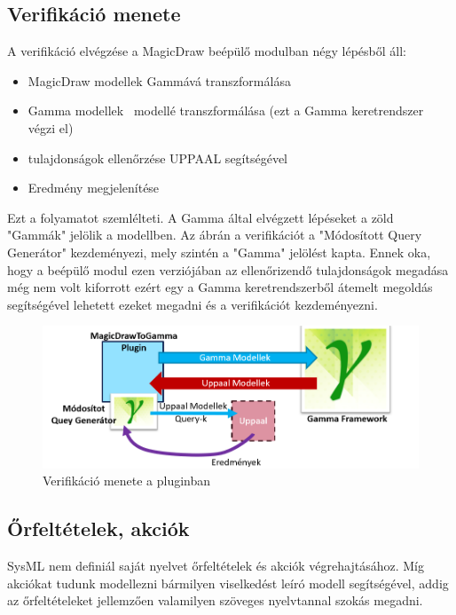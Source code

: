 \subsection{Verifikáció menete}

A verifikáció elvégzése a MagicDraw beépülő modulban négy lépésből áll: 
\begin{itemize}
	\item MagicDraw modellek Gammává transzformálása
	\item Gamma modellek \uppaal\ modellé transzformálása (ezt a Gamma keretrendszer végzi el)
	\item tulajdonságok ellenőrzése UPPAAL segítségével
	\item Eredmény megjelenítése
\end{itemize}
Ezt a folyamatot  szemlélteti. A Gamma által elvégzett lépéseket a zöld "Gammák" jelölik a modellben. Az ábrán a verifikációt a "Módosított Query Generátor" kezdeményezi, mely szintén a "Gamma" jelölést kapta. Ennek oka, hogy a beépülő modul ezen verziójában az ellenőrizendő tulajdonságok megadása még nem volt kiforrott ezért egy a Gamma keretrendszerből átemelt megoldás segítségével lehetett ezeket megadni és a verifikációt kezdeményezni. 

\begin{figure}[!ht]
	\centering
	\includegraphics[width=150mm, keepaspectratio]{figures/preliminaries/concept.png}
	\caption{Verifikáció menete a pluginban}
	\label{fig:preliminaries-verif}
\end{figure}

\subsection{Őrfeltételek, akciók}

SysML nem definiál saját nyelvet őrfeltételek és akciók végrehajtásához. Míg akciókat tudunk modellezni bármilyen viselkedést leíró modell segítségével, addig az őrfeltételeket jellemzően valamilyen szöveges nyelvtannal szokás megadni.

